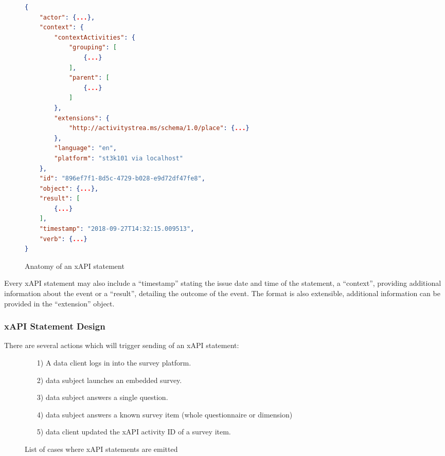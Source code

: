 \documentclass[a4paper,11pt]{article}
\begin{document}
                    \begin{figure}[H]
                        \begin{lstlisting}[language=JSON]
{
    "actor": {...},
    "context": {
        "contextActivities": {
            "grouping": [
                {...}
            ],
            "parent": [
                {...}
            ]
        },
        "extensions": {
            "http://activitystrea.ms/schema/1.0/place": {...}
        },
        "language": "en",
        "platform": "st3k101 via localhost"
    },
    "id": "896ef7f1-8d5c-4729-b028-e9d72df47fe8",
    "object": {...},
    "result": [
        {...}
    ],
    "timestamp": "2018-09-27T14:32:15.009513",
    "verb": {...}
}

                        \end{lstlisting}
                        \caption{Anatomy of an xAPI statement}
                        \label{fig:anatomy-xapi-statement}
                    \end{figure}
                
                Every xAPI statement may also include a ``timestamp'' stating the
                issue date and time of the statement, a ``context'', providing
                additional information about the event or a ``result'', detailing
                the outcome of the event. The format is also extensible,
                additional information can be provided in the ``extension''
                object.

            \subsubsection{xAPI Statement Design}
                There are several actions which will trigger sending of an
                xAPI statement:

                \begin{figure}[H]
                    \begin{itemize}
                        \item[1)] A data client logs in into the survey platform.
                        \item[2)] data subject launches an embedded survey.
                        \item[3)] data subject answers a single question.
                        \item[4)] data subject answers a known survey item (whole questionnaire or dimension)
                        \item[5)] data client updated the xAPI activity ID of a survey item.
                    \end{itemize}
                    \caption{List of cases where xAPI statements are emitted}
                    \label{fig:xapi-statement-list}
                \end{figure}
\end{document}
